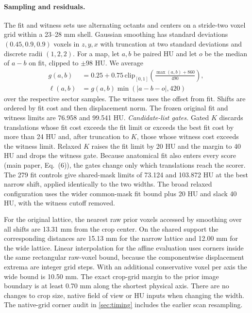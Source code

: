 \paragraph{Sampling and residuals.}
The fit and witness sets use alternating octants and centers on a stride-two voxel grid within a 23--28 mm shell. Gaussian smoothing has standard deviations $(0.45,0.9,0.9)$ voxels in $z,y,x$ with truncation at two standard deviations and discrete radii $(1,2,2)$. For a map, let $a,b$ be paired HU and let $o$ be the median of $a-b$ on fit, clipped to $\pm98$ HU. We average
\begin{align}
g(a,b) &= 0.25+0.75\,\mathrm{clip}_{[0,1]}\left(\frac{\max(a,b)+860}{490}\right),\\
\ell(a,b) &= g(a,b)\min\left(\lvert a-b-o\rvert,420\right)
\end{align}
over the respective sector samples. The witness uses the offset from fit. Shifts are ordered by fit cost and then displacement norm. The frozen original fit and witness limits are 76.958 and 99.541 HU. \emph{Candidate-list gates.} Gated $K$ discards translations whose fit cost exceeds the fit limit or exceeds the best fit cost by more than 24 HU and, after truncation to $K$, those whose witness cost exceeds the witness limit. Relaxed $K$ raises the fit limit by 20 HU and the margin to 40 HU and drops the witness gate. Because anatomical fit also enters every score (main paper, Eq.~(6)), the gates change only which translations reach the scorer. The 279 fit controls give shared-mask limits of 73.124 and 103.872 HU at the best narrow shift, applied identically to the two widths. The broad relaxed configuration uses the wider common-mask fit bound plus 20 HU and slack 40 HU, with the witness cutoff removed.

For the original lattice, the nearest raw prior voxels accessed by smoothing over all shifts are 13.31 mm from the crop center. On the shared support the corresponding distances are 15.13 mm for the narrow lattice and 12.00 mm for the wide lattice. Linear interpolation for the affine evaluation uses corners inside the same rectangular raw-voxel bound, because the componentwise displacement extrema are integer grid steps. With an additional conservative voxel per axis the wide bound is 10.50 mm. The exact crop-grid margin to the prior image boundary is at least 0.70 mm along the shortest physical axis. There are no changes to crop size, native field of view or HU inputs when changing the width. The native-grid corner audit in \cref{sec:timing} includes the earlier scan resampling.

